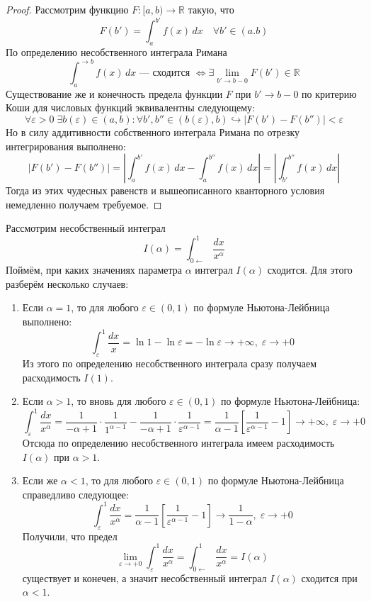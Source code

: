 \documentclass[11pt]{article}
\begin{document}
\begin{proof}
    Рассмотрим функцию $F \colon [a, b) \to \mathbb{R}$ такую, что 
    \[F(b') = \int_{a}^{b'} f(x) \, dx \quad \forall b' \in (a. b)\]
    По определению несобственного интеграла Римана 
    \[\int_{a}^{\to b} f(x) \, dx \text{ --- сходится } \iff \exists \lim_{b' \to b - 0} F(b') \in \mathbb{R}\]
    Существование же и конечность предела функции $F$ при $b' \to b - 0$ по критерию Коши для числовых функций эквивалентны следующему:
    \[\forall \varepsilon > 0 \; \exists b(\varepsilon) \in (a, b) : \forall b', b'' \in (b(\varepsilon), b) \hookrightarrow \left\lvert F(b') - F(b'') \right\rvert < \varepsilon\]
    Но в силу аддитивности собственного интеграла Римана по отрезку интегрирования выполнено:
    \[\left\lvert F(b') - F(b'') \right\rvert = \left\lvert \int_{a}^{b'} f(x) \, dx - \int_{a}^{b''} f(x) \, dx \right\rvert = \left\lvert \int_{b'}^{b''} f(x) \, dx \right\rvert \]
    Тогда из этих чудесных равенств и вышеописанного кванторного условия немедленно получаем требуемое.
\end{proof}

\begin{example}
    Рассмотрим несобственный интеграл
    \[I(\alpha) = \int_{0 \leftarrow}^{1} \frac{dx}{x^{\alpha}}\]
    Поймём, при каких значениях параметра $\alpha$ интеграл $I(\alpha)$ сходится. Для этого разберём несколько случаев:
    \begin{enumerate}
        \item Если $\alpha = 1$, то для любого $\varepsilon \in (0, 1)$ по формуле Ньютона-Лейбница выполнено:
        \[\int_{\varepsilon}^{1} \frac{dx}{x} = \ln 1 - \ln \varepsilon = - \ln \varepsilon \to + \infty, \; \varepsilon \to +0\]
        Из этого по определению несобственного интеграла сразу получаем расходимость $I(1)$.
        \item Если $\alpha > 1$, то вновь для любого $\varepsilon \in (0, 1)$ по формуле Ньютона-Лейбница:
        \[\int_{\varepsilon}^{1} \frac{dx}{x^{\alpha}} = \frac{1}{-\alpha + 1} \cdot \frac{1}{1^{\alpha - 1}} - \frac{1}{-\alpha + 1} \cdot \frac{1}{\varepsilon^{\alpha - 1}} = \frac{1}{\alpha - 1} \left[\frac{1}{\varepsilon^{\alpha - 1}} - 1\right] \to + \infty, \; \varepsilon \to +0\]
        Отсюда по определению несобственного интеграла имеем расходимость $I(\alpha)$ при $\alpha > 1$.
        \item Если же $\alpha < 1$, то для любого $\varepsilon \in (0, 1)$ по формуле Ньютона-Лейбница справедливо следующее:
        \[\int_{\varepsilon}^{1} \frac{dx}{x^{\alpha}} = \frac{1}{\alpha - 1} \left[\frac{1}{\varepsilon^{\alpha - 1}} - 1\right] \to \frac{1}{1 - \alpha}, \; \varepsilon \to +0\]
        Получили, что предел 
        \[\lim_{\varepsilon \to +0} \int_{\varepsilon}^{1} \frac{dx}{x^{\alpha}} = \int_{0 \leftarrow}^{1} \frac{dx}{x^{\alpha}} = I(\alpha)\]
        существует и конечен, а значит несобственный интеграл $I(\alpha)$ сходится при $\alpha < 1$.
    \end{enumerate}
\end{example}
\end{document}
